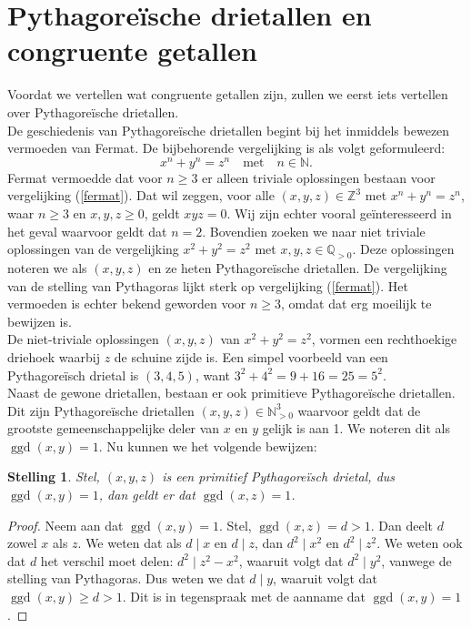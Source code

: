 \documentclass[12pt,reqno]{article}
\newcommand*{\NN}{\ensuremath{\mathbb{N}}}
\newcommand*{\ZZ}{\ensuremath{\mathbb{Z}}}
\newcommand*{\QQ}{\ensuremath{\mathbb{Q}}}
\theoremstyle{theorem}
\newtheorem{theorem}{Stelling}
\theoremstyle{definition}
\DeclareMathOperator{\ggd}{ggd}
\begin{document}
	
	\section{Pythagore\"ische drietallen en congruente getallen}\label{sec:def}
	Voordat we vertellen wat congruente getallen zijn, zullen we eerst iets vertellen over Pythagore\"ische drietallen.\\
	
	De geschiedenis van Pythagore\"ische drietallen begint bij het inmiddels bewezen vermoeden van Fermat. De bijbehorende vergelijking is als volgt geformuleerd:
	\begin{equation}\label{fermat}
	x^n + y^n = z^n \quad \text{met} \quad n \in \NN.
	\end{equation}
	Fermat vermoedde dat voor $n \geq 3$ er alleen triviale oplossingen bestaan voor vergelijking (\ref{fermat}). Dat wil zeggen, voor alle $(x,y,z) \in \ZZ^3$ met $x^n + y^n = z^n$, waar $n \geq 3$ en $x, y, z \geq 0$, geldt $xyz = 0$. Wij zijn echter vooral ge\"interesseerd in het geval waarvoor geldt dat $n=2$. Bovendien zoeken we naar niet triviale oplossingen van de vergelijking $x^2 + y^2 = z^2$ met $x,y,z \in\QQ_{>0}$. Deze oplossingen noteren we als $(x,y,z)$ en ze heten Pythagore\"ische drietallen. De vergelijking van de stelling van Pythagoras lijkt sterk op vergelijking (\ref{fermat}). Het vermoeden is echter bekend geworden voor $n \geq 3$, omdat dat erg moeilijk te bewijzen is. \\
	De niet-triviale oplossingen $(x,y,z)$ van $x^2 + y^2 = z^2$, vormen een rechthoekige driehoek waarbij $z$ de schuine zijde is. Een simpel voorbeeld van een Pythagore\"isch drietal is $(3,4,5)$, want $3^2 + 4^2 = 9 + 16 = 25 = 5^2$. \\
	
	Naast de gewone drietallen, bestaan er ook primitieve \mbox{Pythagore\"ische} drietallen. Dit zijn Pythagore\"ische drietallen $(x,y,z)\in\NN^3_{>0}$ waarvoor geldt dat de grootste gemeenschappelijke deler van $x$ en $y$ gelijk is aan 1. We noteren dit als $\ggd(x,y) = 1$. Nu kunnen we het volgende bewijzen:
	
	\begin{theorem}
		Stel, $(x,y,z)$ is een primitief Pythagore\"isch drietal, dus $\ggd(x,y) = 1$, dan geldt er dat $\ggd(x,z) = 1$.
	\end{theorem}
	\begin{proof}
		Neem aan dat $\ggd(x,y) = 1$. Stel, $\ggd(x,z) = d > 1$. Dan deelt $d$ zowel $x$ als $z$. We weten dat als $d \mid x$ en $d \mid z$, dan $d^2\mid x^2$ en $d^2 \mid z^2$. We weten ook dat $d$ het verschil moet delen: $d^2\mid z^2 - x^2$, waaruit volgt dat $d^2 \mid y^2$, vanwege de stelling van Pythagoras. Dus weten we dat $d \mid y$, waaruit volgt dat $\ggd(x, y) \geq d > 1$. Dit is in tegenspraak met de aanname dat $\ggd(x,y) = 1$.
	\end{proof}
	
\end{document}
